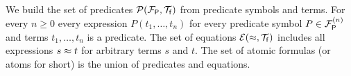 
\begin{definition}\label{def:predicates}
	We build the set of {\myem predicates} ${{\mathcal P}({{\mathcal F}_{\mathsf P}},{\mathcal T}_{\mathsf f}})$
	from predicate symbols and terms. 
	For every $n\geq 0$ every expression $P(t_1,\ldots,t_n)$
	for every predicate symbol $P\in{{\mathcal F}_{\mathsf P}^{(n)}}$ and terms $t_1,\ldots,t_n$ is a predicate.
	The set of {\myem equations }${{\mathcal E}(\approx, {\mathcal T}_{\mathsf f}})$ includes all expressions $s\approx t$ for arbitrary terms $s$ and $t$. 
	The set of atomic formulas (or {\myem atoms }for short) is the union of predicates and equations.
\end{definition}